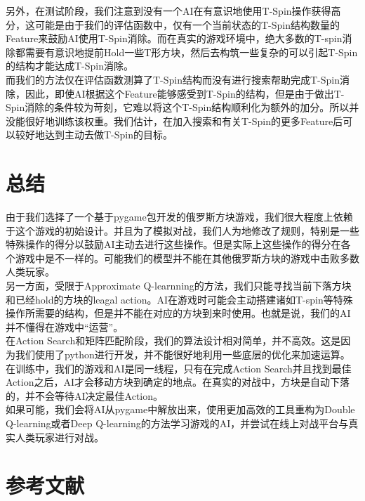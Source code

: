 \documentclass[10pt,UTF8]{article}
\begin{document}
\begin{multicols}{2}

另外，在测试阶段，我们注意到没有一个AI在有意识地使用T-Spin操作获得高分，这可能是由于我们的评估函数中，仅有一个当前状态的T-Spin结构数量的Feature来鼓励AI使用T-Spin消除。而在真实的游戏环境中，绝大多数的T-spin消除都需要有意识地提前Hold一些T形方块，然后去构筑一些复杂的可以引起T-Spin的结构才能达成T-Spin消除。\\
而我们的方法仅在评估函数测算了T-Spin结构而没有进行搜索帮助完成T-Spin消除，因此，即使AI根据这个Feature能够感受到T-Spin的结构，但是由于做出T-Spin消除的条件较为苛刻，它难以将这个T-Spin结构顺利化为额外的加分。所以并没能很好地训练该权重。我们估计，在加入搜索和有关T-Spin的更多Feature后可以较好地达到主动去做T-Spin的目标。

\section{总结}

由于我们选择了一个基于pygame包开发的俄罗斯方块游戏，我们很大程度上依赖于这个游戏的初始设计。并且为了模拟对战，我们人为地修改了规则，特别是一些特殊操作的得分以鼓励AI主动去进行这些操作。但是实际上这些操作的得分在各个游戏中是不一样的。可能我们的模型并不能在其他俄罗斯方块的游戏中击败多数人类玩家。\\

另一方面，受限于Approximate Q-learnning的方法，我们只能寻找当前下落方块和已经hold的方块的leagal action。AI在游戏时可能会主动搭建诸如T-spin等特殊操作所需要的结构，但是并不能在对应的方块到来时使用。也就是说，我们的AI并不懂得在游戏中“运营”。 \\

在Action Search和矩阵匹配阶段，我们的算法设计相对简单，并不高效。这是因为我们使用了python进行开发，并不能很好地利用一些底层的优化来加速运算。\\

在训练中，我们的游戏和AI是同一线程，只有在完成Action Search并且找到最佳Action之后，AI才会移动方块到确定的地点。在真实的对战中，方块是自动下落的，并不会等待AI决定最佳Action。\\

如果可能，我们会将AI从pygame中解放出来，使用更加高效的工具重构为Double Q-learning或者Deep Q-learning的方法学习游戏的AI，并尝试在线上对战平台与真实人类玩家进行对战。

\end{multicols}

\section*{参考文献}
\end{document}
